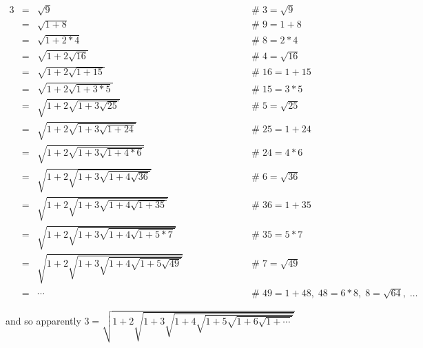 \documentclass{article}
\theoremstyle{definition}
\begin{document}
\begin{center}
\begin{equation*}
\begin{array}{llll}
3 
&=&  \sqrt{9}
				&\qquad \qquad \qquad \mathrel{\#} 3 = \sqrt{9} \\
[6pt]
&=&  \sqrt{1 + 8}
				&\qquad \qquad \qquad \mathrel{\#} 9 = 1 + 8 \\
[6pt]
&=&  \sqrt{1 + 2*4}
				&\qquad \qquad \qquad \mathrel{\#} 8 = 2 * 4 \\
[6pt]
&=&  \sqrt{1 + 2 \sqrt{16}}
				&\qquad \qquad \qquad \mathrel{\#} 4 = \sqrt{16}\\
[6pt]
&=&  \sqrt{1 + 2 \sqrt{1 + 15}}
				&\qquad \qquad \qquad \mathrel{\#} 16 = 1 + 15 \\
[6pt]
&=&  \sqrt{1 + 2 \sqrt{1 + 3*5}}
				&\qquad \qquad \qquad \mathrel{\#} 15 = 3 * 5 \\
[6pt]
&=&  \sqrt{1 + 2 \sqrt{1 + 3 \sqrt{25}}}
				&\qquad \qquad \qquad \mathrel{\#} 5 = \sqrt{25} \\
[6pt]
&=&  \sqrt{1 + 2 \sqrt{1 + 3 \sqrt{1 + 24}}}
				&\qquad \qquad \qquad \mathrel{\#} 25 = 1 + 24 \\
[6pt]
&=&  \sqrt{1 + 2 \sqrt{1 + 3 \sqrt{1 + 4*6}}}
				&\qquad \qquad \qquad \mathrel{\#} 24 = 4 * 6 \\
[6pt]
&=&  \sqrt{1 + 2 \sqrt{1 + 3 \sqrt{1 + 4 \sqrt{36}}}}
				&\qquad \qquad \qquad \mathrel{\#} 6 = \sqrt{36}  \\
[6pt]
&=&  \sqrt{1 + 2 \sqrt{1 + 3 \sqrt{1 + 4 \sqrt{1 + 35}}}}
				&\qquad \qquad \qquad \mathrel{\#} 36 = 1 + 35 \\
[6pt]
&=&  \sqrt{1 + 2 \sqrt{1 + 3 \sqrt{1 + 4 \sqrt{1 + 5*7}}}}
				&\qquad \qquad \qquad \mathrel{\#} 35 = 5 * 7 \\
[6pt]
&=&  \sqrt{1 + 2 \sqrt{1 + 3 \sqrt{1 + 4 \sqrt{1 + 5 \sqrt{49}}}}}
				&\qquad \qquad \qquad \mathrel{\#} 7 = \sqrt{49} \\
[6pt]
&=& \cdots
				&\qquad \qquad \qquad \mathrel{\#} 49 = 1 + 48,\; 48 = 6*8, \; 8 = \sqrt{64}, \; \hdots 
\end{array}
\end{equation*}
\end{center}

\bigskip
\noindent
and so apparently $3 = \sqrt{1+2 \sqrt{1+3 \sqrt{1+4  \sqrt{1+5 \sqrt{1+6 \sqrt{1+\cdots}}}}}}$
%
%
\end{document}
